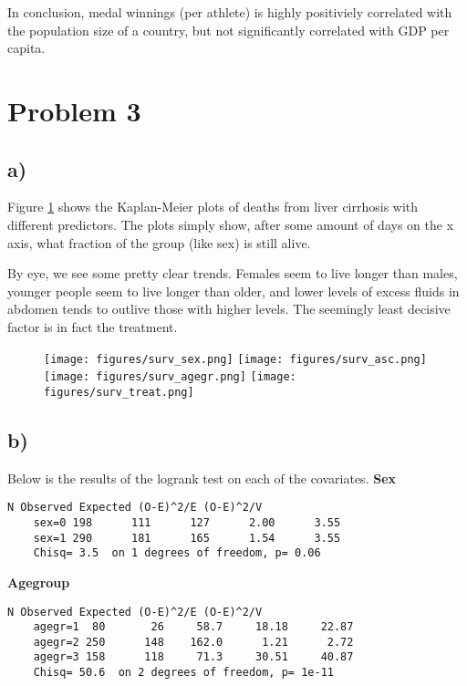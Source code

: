 \documentclass[a4paper, twocolumn]{article}
\begin{document}
In conclusion, medal winnings (per athlete) is highly positiviely correlated with the population size of a country, but not significantly correlated with GDP per capita.


\section*{Problem 3}
\subsection*{a)}
Figure \ref{fig:surv} shows the Kaplan-Meier plots of deaths from liver cirrhosis with different predictors. The plots simply show, after some amount of days on the x axis, what fraction of the group (like sex) is still alive.

By eye, we see some pretty clear trends. Females seem to live longer than males, younger people seem to live longer than older, and lower levels of excess fluids in abdomen tends to outlive those with higher levels. The seemingly least decisive factor is in fact the treatment.

\begin{figure}[h!]
    \texttt{[image: figures/surv\_sex.png]}
    \texttt{[image: figures/surv\_asc.png]}
    \texttt{[image: figures/surv\_agegr.png]}
    \texttt{[image: figures/surv\_treat.png]}
    \caption{}
    \label{fig:surv}
\end{figure}


\subsection*{b)}
Below is the results of the logrank test on each of the covariates.
\textbf{Sex}
\begin{Verbatim}[fontsize=\scriptsize]
            N Observed Expected (O-E)^2/E (O-E)^2/V
    sex=0 198      111      127      2.00      3.55
    sex=1 290      181      165      1.54      3.55
    Chisq= 3.5  on 1 degrees of freedom, p= 0.06 
\end{Verbatim}

\textbf{Agegroup}
\begin{Verbatim}[fontsize=\scriptsize]
            N Observed Expected (O-E)^2/E (O-E)^2/V
    agegr=1  80       26     58.7     18.18     22.87
    agegr=2 250      148    162.0      1.21      2.72
    agegr=3 158      118     71.3     30.51     40.87
    Chisq= 50.6  on 2 degrees of freedom, p= 1e-11 
\end{Verbatim}
\end{document}
